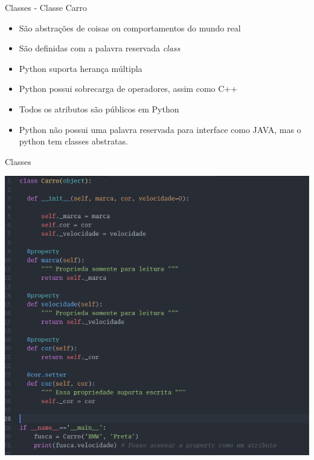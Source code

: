 \begin{frame}{Classes - Classe Carro}

\begin{itemize}
	\item São abstrações de coisas ou comportamentos do mundo real
	\item São definidas com a palavra reservada \textit{class}
	\item Python suporta herança múltipla
	\item Python possui sobrecarga de operadores, assim como C++
	\item Todos os atributos são públicos em Python
	\item Python não possui uma palavra reservada para interface como JAVA, mas o python tem classes abstratas.
	
\end{itemize}

\end{frame}

\begin{frame}{Classes }
\begin{center}
	\includegraphics[scale=0.5]{img/class_example.png}
\end{center}
\end{frame}